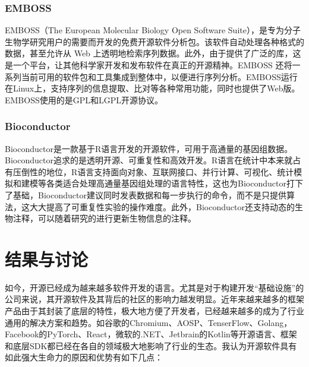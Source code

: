 \documentclass[UTF8]{ctexart}
\begin{document}
\subsubsection{EMBOSS}
EMBOSS（The European Molecular Biology Open Software Suite），是专为分子生物学研究用户的需要而开发的免费开源软件分析包\cite{EMBOSS}。该软件自动处理各种格式的数据，甚至允许从 Web 上透明地检索序列数据。此外，由于提供了广泛的库，这是一个平台，让其他科学家开发和发布软件在真正的开源精神。EMBOSS 还将一系列当前可用的软件包和工具集成到整体中，以便进行序列分析。EMBOSS运行在Linux上，支持序列的信息提取、比对等各种常用功能，同时也提供了Web版。EMBOSS使用的是GPL和LGPL开源协议。
\subsubsection{Bioconductor}
Bioconductor是一款基于R语言开发的开源软件，可用于高通量的基因组数据\cite{Bioconductor}。Bioconductor追求的是透明开源、可重复性和高效开发。R语言在统计中本来就占有压倒性的地位，R语言支持面向对象、互联网接口、并行计算、可视化、统计模拟和建模等各类适合处理高通量基因组处理的语言特性，这也为Bioconductor打下了基础，Bioconductor建议同时发表数据和每一步执行的命令，而不是只提供算法，这大大提高了可重复性实验的操作难度。此外，Bioconductor还支持动态的生物注释，可以随着研究的进行更新生物信息的注释。

\section{结果与讨论}
如今，开源已经成为越来越多软件开发的语言。尤其是对于构建开发“基础设施”的公司来说，其开源软件及其背后的社区的影响力越发明显。近年来越来越多的框架产品由于其封装了底层的特性，极大地方便了开发者，已经越来越多的成为了行业通用的解决方案和趋势。如谷歌的Chromium、AOSP、TenserFlow、Golang，Facebook的PyTorch、React，微软的.NET、Jetbrain的Kotlin等开源语言、框架和底层SDK都已经在各自的领域极大地影响了行业的生态。我认为开源软件具有如此强大生命力的原因和优势有如下几点：
\end{document}
